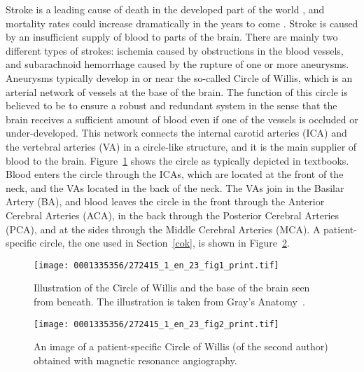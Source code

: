 Stroke is a leading cause of death in the developed part of the
world \citep{Feigin2005}, and mortality rates could increase
dramatically in the years to come \citep{MurrayLopez1997}. Stroke is
caused by an insufficient supply of blood to parts of the brain. There
are mainly two different types of strokes: ischemia caused by
obstructions in the blood vessels, and subarachnoid hemorrhage caused
by the rupture of one or more aneurysms. Aneurysms typically develop
in or near the so-called Circle of Willis, which is an arterial
network of vessels at the base of the brain. The function of this
circle is believed to be to ensure a robust and redundant system in
the sense that the brain receives a sufficient amount of blood even if
one of the vessels is occluded or under-developed. This network
connects the internal carotid arteries (ICA) and the vertebral
arteries (VA) in a circle-like structure, and it is the main
supplier of blood to the brain. Figure~\ref{fig:kvs-2:textbook-circle}
shows the circle as typically depicted in textbooks. Blood enters the
circle through the ICAs, which are located at the front of the neck,
and the VAs located in the back of the neck.  The VAs join in the
Basilar Artery (BA), and blood leaves the circle in the front through
the Anterior Cerebral Arteries (ACA), in the back through the
Posterior Cerebral Arteries (PCA), and at the sides through the Middle
Cerebral Arteries (MCA). A patient-specific circle, the one used in
Section~\ref{cok}, is shown in Figure~\ref{fig:kvs-2:circle_kent}.

\begin{figure}[!t]
\centering
\texttt{[image: 0001335356/272415\_1\_en\_23\_fig1\_print.tif]}
\caption{Illustration of the Circle of Willis and the base of the brain
seen from beneath. The illustration is taken from Gray's Anatomy~\citep{Gray1897}.}
\label{fig:kvs-2:textbook-circle}\vspace*{10pt}
\end{figure}

\begin{figure}[!t]
\centering
\texttt{[image: 0001335356/272415\_1\_en\_23\_fig2\_print.tif]}
\caption{An image of a patient-specific Circle of Willis (of the second author) obtained with magnetic resonance angiography.}
\label{fig:kvs-2:circle_kent}
\end{figure}


